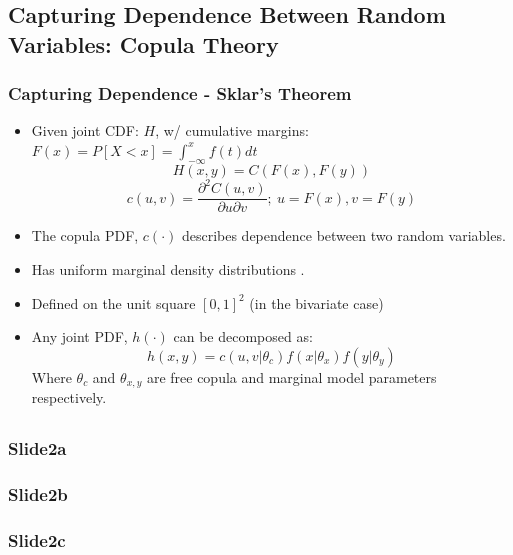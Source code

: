 \documentclass[t, pdftex]{beamer}
\begin{document}
\subsection*{Capturing Dependence Between Random Variables: Copula Theory}
\begin{frame}
\frametitle{Capturing Dependence - Sklar's Theorem}
\vspace{-12pt}
\begin{itemize}
\item Given joint CDF: $H$, w/ cumulative margins: $F(x)=P[X < x] = \int_{-\infty}^{x}f(t)dt$
\[
H(x,y) = C(F(x), F(y))
\]
\[
c(u, v) = \frac{\partial^2 C(u, v)}{\partial u \partial v};\ u=F(x), v=F(y)
\]
\item  The copula PDF, $c(\cdot)$ describes dependence between two random variables.
\item  Has uniform marginal density distributions \cite{Nelsen2006}.
\item  Defined on the unit square $[0, 1]^2$ (in the bivariate case)
\item  Any joint PDF, $h(\cdot)$ can be decomposed as: \\
\[
h(x, y) = c(u, v |\theta_c)f(x|\theta_x)f(y|\theta_y)
\]
Where $\theta_c$ and $\theta_{x,y}$ are free copula and marginal model parameters respectively.
\end{itemize}
\end{frame}

\subsection{}
\begin{frame}
\frametitle<1>{Slide2a}
\frametitle<2>{Slide2b}
\frametitle<3>{Slide2c}


\end{frame}
\end{document}

